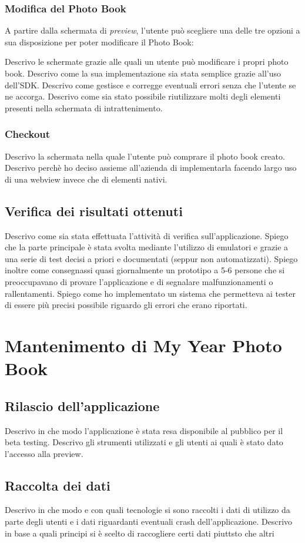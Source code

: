 			\subsubsection{Modifica del Photo Book}
				A partire dalla schermata di \emph{preview}, l'utente può scegliere una delle tre opzioni a sua disposizione per
				poter modificare il Photo Book:
				
				Descrivo le schermate grazie alle quali un utente può modificare i propri photo book. Descrivo come la sua
				implementazione sia stata semplice grazie all'uso dell'SDK. Descrivo come gestisce e corregge eventuali errori senza
				che l'utente se ne accorga. Descrivo come sia stato possibile riutilizzare molti degli elementi presenti nella
				schermata di intrattenimento.
			\subsubsection{Checkout}
				Descrivo la schermata nella quale l'utente può comprare il photo book creato. Descrivo perchè ho deciso assieme
				all'azienda di implementarla facendo largo uso di una webview invece che di elementi nativi.
		\subsection{Verifica dei risultati ottenuti}
			Descrivo come sia stata effettuata l'attività di verifica sull'applicazione. Spiego che la parte principale è stata
			svolta mediante l'utilizzo di emulatori e grazie a una serie di test decisi a priori e documentati (seppur non
			automatizzati). Spiego inoltre come consegnassi quasi giornalmente un prototipo a 5-6 persone che si preoccupavano
			di provare l'applicazione e di segnalare malfunzionamenti o rallentamenti. Spiego come ho implementato un sistema
			che permetteva ai tester di essere più precisi possibile riguardo gli errori che erano riportati.
	\section{Mantenimento di My Year Photo Book}
		\subsection{Rilascio dell'applicazione}
			Descrivo in che modo l'applicazione è stata resa disponibile al pubblico per il beta testing. Descrivo gli strumenti
			utilizzati e gli utenti ai quali è stato dato l'accesso alla preview.
		\subsection{Raccolta dei dati}
			Descrivo in che modo e con quali tecnologie si sono raccolti i dati di utilizzo da parte degli utenti e i dati riguardanti
			eventuali crash dell'applicazione. Descrivo in base a quali principi si è scelto di raccogliere certi dati piuttsto che altri
